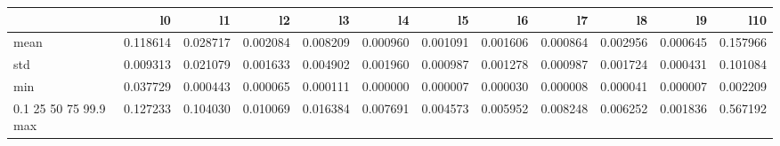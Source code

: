 \begin{tabular}{lrrrrrrrrrrr}
\toprule
 & l0 & l1 & l2 & l3 & l4 & l5 & l6 & l7 & l8 & l9 & l10 \\
\midrule
mean & 0.118614 & 0.028717 & 0.002084 & 0.008209 & 0.000960 & 0.001091 & 0.001606 & 0.000864 & 0.002956 & 0.000645 & 0.157966 \\
std & 0.009313 & 0.021079 & 0.001633 & 0.004902 & 0.001960 & 0.000987 & 0.001278 & 0.000987 & 0.001724 & 0.000431 & 0.101084 \\
min & 0.037729 & 0.000443 & 0.000065 & 0.000111 & 0.000000 & 0.000007 & 0.000030 & 0.000008 & 0.000041 & 0.000007 & 0.002209 \\
0.1%
25%
50%
75%
99.9%
max & 0.127233 & 0.104030 & 0.010069 & 0.016384 & 0.007691 & 0.004573 & 0.005952 & 0.008248 & 0.006252 & 0.001836 & 0.567192 \\
\bottomrule
\end{tabular}
